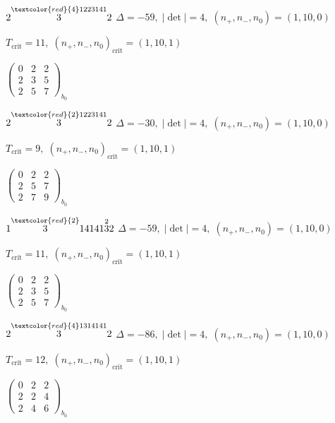 \documentclass[10pt]{article}
\begin{document}
$2\overset{\textcolor{red}{4}1223141}{3}2$ \quad $\Delta=-59,\; |\det|=4,\; (n_+,n_-,n_0)=(1,10,0)$

\hspace{1em}$T_{\text{crit}}=11,\; (n_+,n_-,n_0)_{\text{crit}}=(1,10,1)$

\hspace{2em}$\left(\begin{smallmatrix}0 & 2 & 2 \\ 2 & 3 & 5 \\ 2 & 5 & 7\end{smallmatrix}\right)_{\!b_0}$

$2\overset{\textcolor{red}{2}1223141}{3}2$ \quad $\Delta=-30,\; |\det|=4,\; (n_+,n_-,n_0)=(1,10,0)$

\hspace{1em}$T_{\text{crit}}=9,\; (n_+,n_-,n_0)_{\text{crit}}=(1,10,1)$

\hspace{2em}$\left(\begin{smallmatrix}0 & 2 & 2 \\ 2 & 5 & 7 \\ 2 & 7 & 9\end{smallmatrix}\right)_{\!b_0}$

\smallskip

$1\overset{\textcolor{red}{2}}{3}14141\overset{2}{3}2$ \quad $\Delta=-59,\; |\det|=4,\; (n_+,n_-,n_0)=(1,10,0)$

\hspace{1em}$T_{\text{crit}}=11,\; (n_+,n_-,n_0)_{\text{crit}}=(1,10,1)$

\hspace{2em}$\left(\begin{smallmatrix}0 & 2 & 2 \\ 2 & 3 & 5 \\ 2 & 5 & 7\end{smallmatrix}\right)_{\!b_0}$

$2\overset{\textcolor{red}{4}1314141}{3}2$ \quad $\Delta=-86,\; |\det|=4,\; (n_+,n_-,n_0)=(1,10,0)$

\hspace{1em}$T_{\text{crit}}=12,\; (n_+,n_-,n_0)_{\text{crit}}=(1,10,1)$

\hspace{2em}$\left(\begin{smallmatrix}0 & 2 & 2 \\ 2 & 2 & 4 \\ 2 & 4 & 6\end{smallmatrix}\right)_{\!b_0}$
\end{document}
